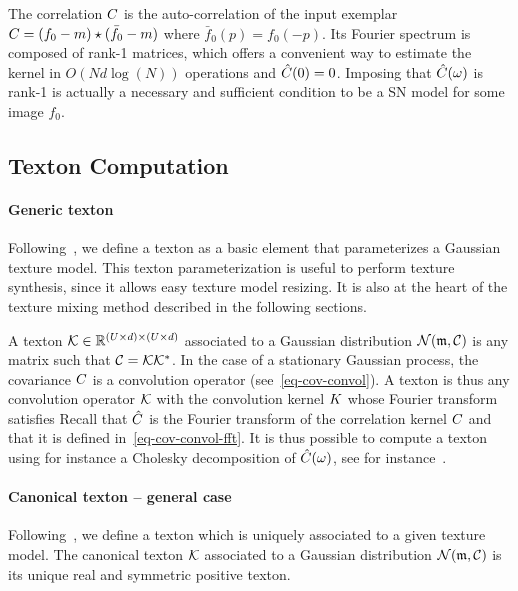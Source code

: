 The correlation $C$ is the auto-correlation of the input exemplar $C=(f_0-m) \star (\bar f_0-m)$ where $\bar f_0(p) = f_0(-p)$. Its Fourier spectrum is composed of rank-1 matrices, which offers a convenient way to estimate the kernel in $O(Nd \log(N))$ operations
and $\hat{C}(0) = 0$. Imposing that $\hat {C}(\omega)$ is rank-1 is actually a necessary and sufficient condition to be a SN model for some image $f_0$.


\subsection{Texton Computation}

\paragraph{Generic texton}

Following~\cite{Desolneux-Moisan-12}, we define a texton as a basic element that parameterizes a Gaussian texture model. This texton parameterization is useful to perform texture synthesis, since it allows easy texture model resizing. It is also at the heart of the texture mixing method described in the following sections. 

A texton $\mathcal{K} \in \mathbb{R}^{(U \times d) \times (U \times d)}$ associated to a Gaussian distribution $\mathcal{N}({\frak m},\mathcal{C})$ is any matrix such that $\mathcal{C} = \mathcal{K} \mathcal{K}^*$. In the case of a stationary Gaussian process, the covariance $C$ is a convolution operator (see~\eqref{eq-cov-convol}). A texton is thus any convolution operator $\mathcal{K}$ with the convolution kernel $K$ whose Fourier transform satisfies
Recall that $\hat {C}$ is the Fourier transform of the correlation kernel $C$ and that it is defined in~\eqref{eq-cov-convol-fft}. It is thus possible to compute a texton using for instance a Cholesky decomposition of $\hat {C}(\omega)$, see for instance~\cite{Gentle}.

\paragraph{Canonical texton -- general case}

Following~\cite{Desolneux-texton}, we define a texton which is uniquely associated to a given texture model. The canonical texton $\mathcal{K}$ associated to a Gaussian distribution $\mathcal{N}({\frak m},\mathcal{C})$ is its unique real and symmetric positive texton.
	
